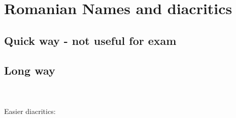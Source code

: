 \section{Romanian Names and diacritics}
\subsection[Quick way]{Quick way - not useful for exam}

\code{\usepackage[romanian]{babel}}

\subsection{Long way}
\begin{latex}
\renewcommand{\contentsname}{Cuprins}
\renewcommand{\chaptername}{Capitolul}

\renewcommand{\bibname}{B\lowercase{ibliografie}}
\renewcommand{\refname}{B\lowercase{ibliografie}} %

\renewcommand{\appendixname}{Anexa}
\renewcommand{\indexname}{I\lowercase{ndice}}
\renewcommand{\abstractname}{Rezumatul lucr\u{a}rii}
\renewcommand{\listtablename}{Lista de tabele}
\renewcommand{\listfigurename}{Lista de figuri}
\end{latex}


\\
\\
Easier diacritics:
\begin{latex}
\code{\usepackage[romanian]{babel}}
\end{latex}